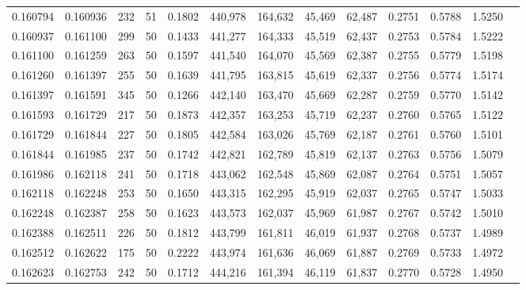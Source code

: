 \begin{tabular}{rrrrrrrrrrrrr}
0.160794 & 0.160936 &   232 &  51 &                                     0.1802 & 440,978 & 164,632 &  45,469 &  62,487 & 0.2751 & 0.5788 & 1.5250 \\
0.160937 & 0.161100 &   299 &  50 &                                     0.1433 & 441,277 & 164,333 &  45,519 &  62,437 & 0.2753 & 0.5784 & 1.5222 \\
0.161100 & 0.161259 &   263 &  50 &                                     0.1597 & 441,540 & 164,070 &  45,569 &  62,387 & 0.2755 & 0.5779 & 1.5198 \\
0.161260 & 0.161397 &   255 &  50 &                                     0.1639 & 441,795 & 163,815 &  45,619 &  62,337 & 0.2756 & 0.5774 & 1.5174 \\
0.161397 & 0.161591 &   345 &  50 &                                     0.1266 & 442,140 & 163,470 &  45,669 &  62,287 & 0.2759 & 0.5770 & 1.5142 \\
0.161593 & 0.161729 &   217 &  50 &                                     0.1873 & 442,357 & 163,253 &  45,719 &  62,237 & 0.2760 & 0.5765 & 1.5122 \\
0.161729 & 0.161844 &   227 &  50 &                                     0.1805 & 442,584 & 163,026 &  45,769 &  62,187 & 0.2761 & 0.5760 & 1.5101 \\
0.161844 & 0.161985 &   237 &  50 &                                     0.1742 & 442,821 & 162,789 &  45,819 &  62,137 & 0.2763 & 0.5756 & 1.5079 \\
0.161986 & 0.162118 &   241 &  50 &                                     0.1718 & 443,062 & 162,548 &  45,869 &  62,087 & 0.2764 & 0.5751 & 1.5057 \\
0.162118 & 0.162248 &   253 &  50 &                                     0.1650 & 443,315 & 162,295 &  45,919 &  62,037 & 0.2765 & 0.5747 & 1.5033 \\
0.162248 & 0.162387 &   258 &  50 &                                     0.1623 & 443,573 & 162,037 &  45,969 &  61,987 & 0.2767 & 0.5742 & 1.5010 \\
0.162388 & 0.162511 &   226 &  50 &                                     0.1812 & 443,799 & 161,811 &  46,019 &  61,937 & 0.2768 & 0.5737 & 1.4989 \\
0.162512 & 0.162622 &   175 &  50 &                                     0.2222 & 443,974 & 161,636 &  46,069 &  61,887 & 0.2769 & 0.5733 & 1.4972 \\
0.162623 & 0.162753 &   242 &  50 &                                     0.1712 & 444,216 & 161,394 &  46,119 &  61,837 & 0.2770 & 0.5728 & 1.4950 \\

\end{tabular}

